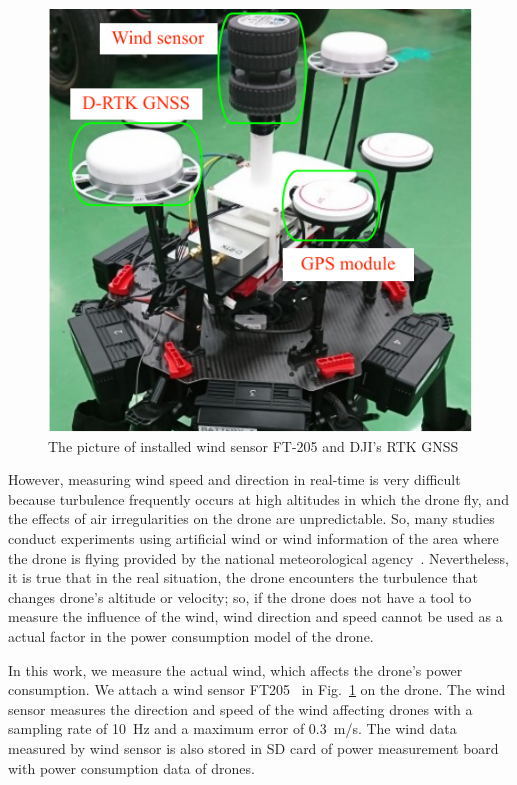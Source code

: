 \documentclass[journal]{./template/IEEEtran}
\begin{document}
\begin{figure}[ht]
\centering\includegraphics[scale=0.75]{fig5/wind_sensor.pdf}
\caption{The picture of installed wind sensor FT-205 and DJI's RTK GNSS}
\label{fig:wind_sensor}
\end{figure}

However, measuring wind speed and direction in real-time is very difficult because turbulence frequently occurs at high altitudes in which the drone fly, and the effects of air irregularities on the drone are unpredictable.
So, many studies conduct experiments using artificial wind or wind information of the area where the drone is flying provided by the national meteorological agency~\cite{ref_5,ref_9}. 
Nevertheless, it is true that in the real situation, the drone encounters the turbulence that changes drone's altitude or velocity; so, if the drone does not have a tool to measure the influence of the wind, wind direction and speed cannot be used as a actual factor in the power consumption model of the drone. 

In this work, we measure the actual wind, which affects the drone's power consumption. We attach a wind sensor FT205~\cite{ref_15} in Fig.~\ref{fig:wind_sensor} on the drone. 
The wind sensor measures the direction and speed of the wind affecting drones with a sampling rate of 10~Hz and a maximum error of 0.3~m/s.
The wind data measured by wind sensor is also stored in SD card of power measurement board with power consumption data of drones.
\end{document}
